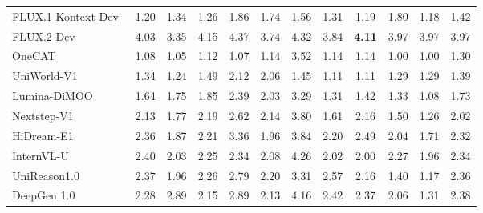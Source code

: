\begin{table}[t]
{\begin{tabular}{l|cccccccccc|c}
            

            FLUX.1 Kontext Dev~\cite{labs2025flux}
            & 1.20 & 1.34 & 1.26 & 1.86 & 1.74 & 1.56 & 1.31 & 1.19 & 1.80 & 1.18
            & \cellcolor[HTML]{C8C8C8}1.42  \\

            FLUX.2 Dev~\cite{flux-2-2025}
            & 4.03 & 3.35 & 4.15 & 4.37 & 3.74 & 4.32 & 3.84 & \color[HTML]{F88825}\textbf{4.11} & 3.97 & 3.97
            & \cellcolor[HTML]{C8C8C8}3.97  \\

            \midrule

            OneCAT~\cite{li2025onecat}
            & 1.08 & 1.05 & 1.12 & 1.07 & 1.14 & 3.52 & 1.14 & 1.14 & 1.00 & 1.00
            & \cellcolor[HTML]{C8C8C8}1.30 \\

            UniWorld-V1~\cite{lin2025uniworld}
            & 1.34 & 1.24 & 1.49 & 2.12 & 2.06 & 1.45 & 1.11 & 1.11 & 1.29 & 1.29
            & \cellcolor[HTML]{C8C8C8}1.39 \\

            Lumina-DiMOO~\cite{xin2025lumina}
            & 1.64 & 1.75 & 1.85 & 2.39 & 2.03 & 3.29 & 1.31 & 1.42 & 1.33 & 1.08
            & \cellcolor[HTML]{C8C8C8}1.73 \\

            Nextstep-V1~\cite{han2025nextstep}
            & 2.13 & 1.77 & 2.19 & 2.62 & 2.14 & 3.80 & 1.61 & 2.16 & 1.50 & 1.26
            & \cellcolor[HTML]{C8C8C8}2.02 \\

            HiDream-E1~\cite{cai2025hidream}
            & 2.36 & 1.87 & 2.21 & 3.36 & 1.96 & 3.84 & 2.20 & 2.49 & 2.04 & 1.71
            & \cellcolor[HTML]{C8C8C8}2.32 \\

            InternVL-U~\cite{tian2026internvl}
            & 2.40 & 2.03 & 2.25 & 2.34 & 2.08 & 4.26 & 2.02 & 2.00 & 2.27 & 1.96
            & \cellcolor[HTML]{C8C8C8}2.34 \\

            UniReason1.0~\cite{wang2026unireason}
            & 2.37 & 1.96 & 2.26 & 2.79 & 2.20 & 3.31 & 2.57 & 2.16 & 1.40 & 1.17
            & \cellcolor[HTML]{C8C8C8}2.36 \\

            DeepGen 1.0~\cite{wang2026deepgen}
            & 2.28 & 2.89 & 2.15 & 2.89 & 2.13 & 4.16 & 2.42 & 2.37 & 2.06 & 1.31
            & \cellcolor[HTML]{C8C8C8}2.38 \\


\end{tabular}}
\end{table}
